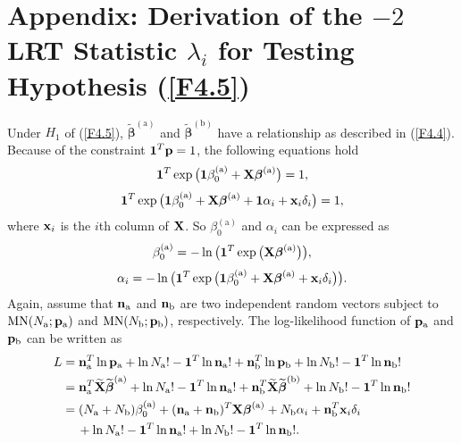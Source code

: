 \section{Appendix:
Derivation of the $-2$LRT Statistic $\lambda_i$ for Testing Hypothesis
(\ref{F4.5})}\label{sec4.7}

Under $H_1$ of (\ref{F4.5}), $\widetilde{\bm\beta}^{(\mathrm{a})}$ and
$\widetilde{\bm\beta}^{(\mathrm{b})}$ have a relationship as described in
(\ref{F4.4}). Because of the constraint $\boldsymbol 1^T{\bf p}=1$, the following equations
hold
\[
\boldsymbol{1}^T\exp\big(\boldsymbol{1}\beta^{(\mathrm{a})}_0 +{\bf
X}\boldsymbol\beta^{(\mathrm{a})}\big)=1,
\]
\[
\boldsymbol{1}^T\exp\big(\boldsymbol{1}\beta^{(\mathrm{a})}_0 +{\bf
X}\boldsymbol\beta^{(\mathrm{a})}+\boldsymbol{1}\alpha_i+{\bf x}_i\delta_i\big)=1,
\]
where ${\bf x}_i$ is the $i$th column of $\bf X$. So $\beta^{(\mathrm{a})}_0$ and
$\alpha_i$ can be expressed as
\[
\beta^{(\mathrm{a})}_0=-\ln\big(\boldsymbol{1}^T\exp\big({\bf
X}\boldsymbol\beta^{(\mathrm{a})}\big)\big),
\]
\[
\alpha_i=-\ln\big(\boldsymbol{1}^T\exp\big(\boldsymbol{1}\beta^{(\mathrm{a})}_0 +{\bf
X}\boldsymbol\beta^{(\mathrm{a})}+{\bf x}_i\delta_i\big)\big).
\]
Again, assume that ${\bf n}_{\mathrm{a}}$ and ${\bf n}_{\mathrm{b}}$ are two
independent random vectors subject to $\mbox{MN}(N_{\mathrm{a}};{\bf
p}_{\mathrm{a}})$ and $\mbox{MN}(N_{\mathrm{b}};{\bf p}_{\mathrm{b}})$,
respectively. The log-likelihood function of ${\bf p}_{\mathrm{a}}$ and ${\bf
p}_{\mathrm{b}}$ can be written as
\begin{align*}
L&={\bf n}_{\mathrm{a}}^T\ln{\bf p}_{\mathrm{a}}+\ln N_{\mathrm{a}}!-\boldsymbol 1^T\ln{\bf
n}_{\mathrm{a}}!+{\bf
n}_{\mathrm{b}}^T\ln{\bf p}_{\mathrm{b}}+\ln N_{\mathrm{b}}!-\boldsymbol 1^T\ln{\bf n}_{\mathrm{b}}!\\
&={\bf n}_{\mathrm{a}}^T\widetilde{\bf X}\widetilde{\boldsymbol\beta}^{(\mathrm{a})}+\ln
N_{\mathrm{a}}!-\boldsymbol 1^T\ln{\bf n}_{\mathrm{a}}!+{\bf n}_{\mathrm{b}}^T\widetilde{\bf
X}\widetilde{\boldsymbol\beta}^{(\mathrm{b})}+\ln N_{\mathrm{b}}!-\boldsymbol 1^T\ln{\bf n}_{\mathrm{b}}!\\
&=(N_{\mathrm{a}}+N_{\mathrm{b}})\beta^{(\mathrm{a})}_0+({\bf n}_{\mathrm{a}}+{\bf
n}_{\mathrm{b}})^T{\bf X}\boldsymbol\beta^{(\mathrm{a})}+N_{\mathrm{b}}\alpha_i+{\bf
n}_{\mathrm{b}}^T{\bf
x}_i\delta_i\\
&\ \ \;\;+\ln N_{\mathrm{a}}!-\boldsymbol 1^T\ln{\bf n}_{\mathrm{a}}!+\ln
N_{\mathrm{b}}!-\boldsymbol 1^T\ln{\bf n}_{\mathrm{b}}!.
\end{align*}

